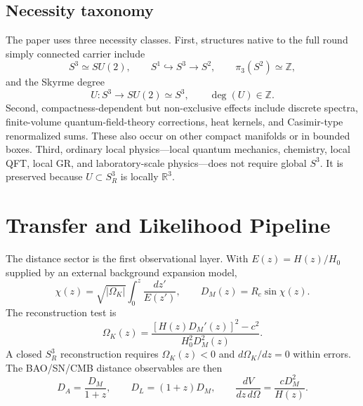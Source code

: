 \documentclass[aps,prd,onecolumn,superscriptaddress,longbibliography,nofootinbib,notitlepage]{revtex4-2}
\begin{document}
\subsection{Necessity taxonomy}

The paper uses three necessity classes. First, structures native to the full round
simply connected carrier include
\begin{equation}
  S^3\simeq SU(2),
  \qquad
  S^1\hookrightarrow S^3\to S^2,
  \qquad
  \pi_3(S^2)\simeq\mathbb Z,
\end{equation}
and the Skyrme degree
\begin{equation}
  U:S^3\to SU(2)\simeq S^3,
  \qquad \deg(U)\in\mathbb Z.
\end{equation}
Second, compactness-dependent but non-exclusive effects include discrete spectra,
finite-volume quantum-field-theory corrections, heat kernels, and Casimir-type
renormalized sums. These also occur on other compact manifolds or in bounded boxes.
Third, ordinary local physics---local quantum mechanics, chemistry, local QFT, local GR,
and laboratory-scale physics---does not require global $S^3$. It is preserved because
$U\subset S^3_R$ is locally $\mathbb R^3$.

\section{Transfer and Likelihood Pipeline}
\label{sec:transfer-likelihood-compressed}

The distance sector is the first observational layer. With $E(z)=H(z)/H_0$ supplied by
an external background expansion model,
\begin{equation}
  \chi(z)=\sqrt{|\Omega_K|}\int_0^z\frac{dz'}{E(z')},
  \qquad
  D_M(z)=R_c\sin\chi(z).
\end{equation}
The reconstruction test is
\begin{equation}
  \Omega_K(z)=\frac{[H(z)D_M'(z)]^2-c^2}{H_0^2D_M^2(z)}.
\end{equation}
A closed $S^3_R$ reconstruction requires $\Omega_K(z)<0$ and $d\Omega_K/dz=0$ within
errors. The BAO/SN/CMB distance observables are then
\begin{equation}
  D_A=\frac{D_M}{1+z},
  \qquad
  D_L=(1+z)D_M,
  \qquad
  \frac{dV}{dz\,d\Omega}=\frac{cD_M^2}{H(z)}.
\end{equation}
\end{document}
